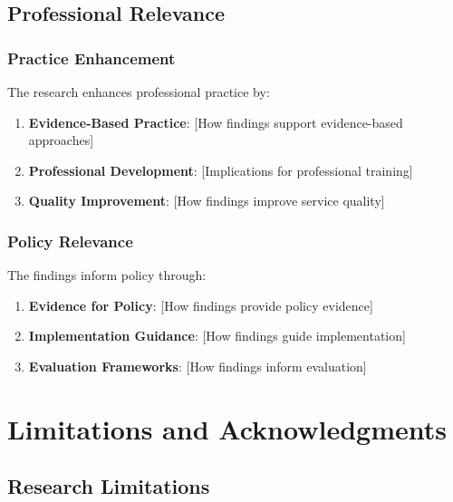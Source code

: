 \documentclass[
  12pt,
  letterpaper,
  12pt,
  letterpaper,
  oneside]{report}
\providecommand{\tightlist}{%
  \setlength{\itemsep}{0pt}\setlength{\parskip}{0pt}}
\begin{document}
\subsection{Professional Relevance}\label{professional-relevance}

\subsubsection{Practice Enhancement}\label{practice-enhancement}

The research enhances professional practice by:

\begin{enumerate}
\def\labelenumi{\arabic{enumi}.}
\tightlist
\item
  \textbf{Evidence-Based Practice}: {[}How findings support
  evidence-based approaches{]}
\item
  \textbf{Professional Development}: {[}Implications for professional
  training{]}
\item
  \textbf{Quality Improvement}: {[}How findings improve service
  quality{]}
\end{enumerate}

\subsubsection{Policy Relevance}\label{policy-relevance}

The findings inform policy through:

\begin{enumerate}
\def\labelenumi{\arabic{enumi}.}
\tightlist
\item
  \textbf{Evidence for Policy}: {[}How findings provide policy
  evidence{]}
\item
  \textbf{Implementation Guidance}: {[}How findings guide
  implementation{]}
\item
  \textbf{Evaluation Frameworks}: {[}How findings inform evaluation{]}
\end{enumerate}

\section{Limitations and
Acknowledgments}\label{limitations-and-acknowledgments}

\subsection{Research Limitations}\label{research-limitations}
\end{document}
